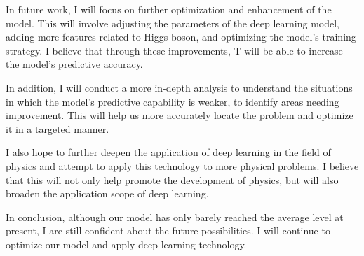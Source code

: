 \documentclass[a4paper,12pt, oneside]{article}
\begin{document}
In future work, I will focus on further optimization and enhancement of the model. This will involve adjusting the parameters of the deep learning model, adding more features related to Higgs boson, and optimizing the model's training strategy. I believe that through these improvements, T will be able to increase the model's predictive accuracy.

In addition, I will conduct a more in-depth analysis to understand the situations in which the model's predictive capability is weaker, to identify areas needing improvement. This will help us more accurately locate the problem and optimize it in a targeted manner.

I also hope to further deepen the application of deep learning in the field of physics and attempt to apply this technology to more physical problems. I believe that this will not only help promote the development of physics, but will also broaden the application scope of deep learning.

In conclusion, although our model has only barely reached the average level at present, I are still confident about the future possibilities. I will continue to optimize our model and apply deep learning technology.

\newpage


\end{document}
